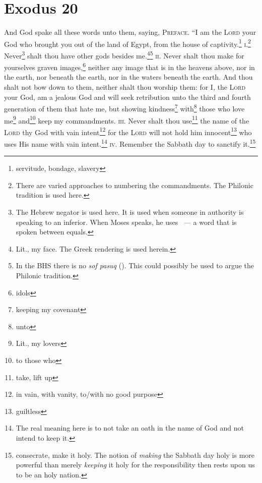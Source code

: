 \section{Exodus 20}\label{exodus:20}
\begin{enumerate}[align=center]
     And God spake all these words unto them, saying,%
     \textsc{Preface.} ``I am the \textsc{Lord} your God who brought you out of the land of Egypt, from the house of captivity.\footnote{servitude, bondage, slavery}%
     \textsc{i.}\footnote{There are varied approaches to numbering the commandments. The Philonic tradition is used here.} Never\footnote{The Hebrew negator  is used here. It is used when someone in authority is speaking to an inferior. When Moses speaks, he uses ~--- a word that is spoken between equals.} shalt thou have other gods besides me.\footnote{Lit., my face. The Greek rendering is used herein.}\footnote{In the BHS there is no \emph{sof pasuq} (). This could possibly be used to argue the Philonic tradition.}%
     \textsc{ii.} Never shalt thou make for yourselves graven images,\footnote{idols} neither any image that is in the heavens above, nor in the earth, nor beneath the earth, nor in the waters beneath the earth.%
     And thou shalt not bow down to them, neither shalt thou worship them: for I, the \textsc{Lord} your God, am a jealous God and will seek retribution unto the third and fourth generation of them that hate me,%
     but showing kindness\footnote{keeping my covenant} with\footnote{unto} those who love me\footnote{Lit., my lovers} and\footnote{to those who} keep my commandments.%
     \textsc{iii.} Never shalt thou use\footnote{take, lift up} the name of the \textsc{Lord} thy God with vain intent\footnote{in vain, with vanity, to/with no good purpose} for the \textsc{Lord} will not hold him innocent\footnote{guiltless} who uses His name with vain intent.\footnote{The real meaning here is to not take an oath in the name of God and not intend to keep it.}%
     \textsc{iv.} Remember the Sabbath day to sanctify it.\footnote{consecrate, make it holy. The notion of \emph{making} the Sabbath day holy is more powerful than merely \emph{keeping} it holy for the responsibility then rests upon us to be an holy nation.}%

\end{enumerate}
